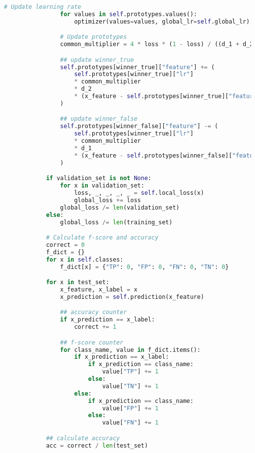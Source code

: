 \begin{lstlisting}[language=Python]
                # Update learning rate
                for values in self.prototypes.values():
                    optimizer(values=values, global_lr=self.global_lr)

                # Update prototypes
                common_multiplier = 4 * loss * (1 - loss) / ((d_1 + d_2) ** 2)

                ## update winner_true
                self.prototypes[winner_true]["feature"] += (
                    self.prototypes[winner_true]["lr"]
                    * common_multiplier
                    * d_2
                    * (x_feature - self.prototypes[winner_true]["feature"])
                )

                ## update winner_false
                self.prototypes[winner_false]["feature"] -= (
                    self.prototypes[winner_true]["lr"]
                    * common_multiplier
                    * d_1
                    * (x_feature - self.prototypes[winner_false]["feature"])
                )

            if validation_set is not None:
                for x in validation_set:
                    loss, _, _, _, _ = self.local_loss(x)
                    global_loss += loss
                global_loss /= len(validation_set)
            else:
                global_loss /= len(training_set)

            # Calculate f-score and accuracy
            correct = 0
            f_dict = {}
            for x in self.classes:
                f_dict[x] = {"TP": 0, "FP": 0, "FN": 0, "TN": 0}

            for x in test_set:
                x_feature, x_label = x
                x_prediction = self.prediction(x_feature)

                ## accuracy counter
                if x_prediction == x_label:
                    correct += 1

                ## f-score counter
                for class_name, value in f_dict.items():
                    if x_prediction == x_label:
                        if x_prediction == class_name:
                            value["TP"] += 1
                        else:
                            value["TN"] += 1
                    else:
                        if x_prediction == class_name:
                            value["FP"] += 1
                        else:
                            value["FN"] += 1

            ## calculate accuracy
            acc = correct / len(test_set)


\end{lstlisting}
